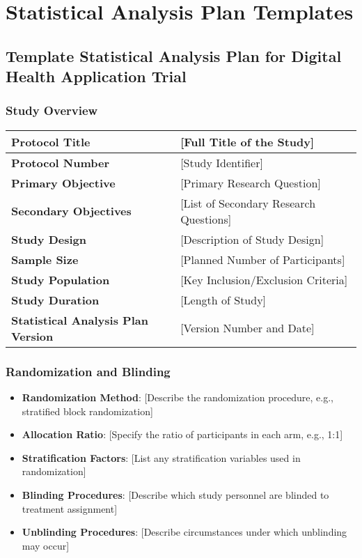 \chapter{Statistical Analysis Plan Templates}

\section{Template Statistical Analysis Plan for Digital Health Application Trial}

\subsection{Study Overview}

\begin{tcolorbox}[title=Study Information]
\begin{tabular}{|p{4cm}|p{10cm}|}
\hline
\textbf{Protocol Title} & [Full Title of the Study] \\
\hline
\textbf{Protocol Number} & [Study Identifier] \\
\hline
\textbf{Primary Objective} & [Primary Research Question] \\
\hline
\textbf{Secondary Objectives} & [List of Secondary Research Questions] \\
\hline
\textbf{Study Design} & [Description of Study Design] \\
\hline
\textbf{Sample Size} & [Planned Number of Participants] \\
\hline
\textbf{Study Population} & [Key Inclusion/Exclusion Criteria] \\
\hline
\textbf{Study Duration} & [Length of Study] \\
\hline
\textbf{Statistical Analysis Plan Version} & [Version Number and Date] \\
\hline
\end{tabular}
\end{tcolorbox}

\subsection{Randomization and Blinding}

\begin{itemize}
    \item \textbf{Randomization Method}: [Describe the randomization procedure, e.g., stratified block randomization]
    
    \item \textbf{Allocation Ratio}: [Specify the ratio of participants in each arm, e.g., 1:1]
    
    \item \textbf{Stratification Factors}: [List any stratification variables used in randomization]
    
    \item \textbf{Blinding Procedures}: [Describe which study personnel are blinded to treatment assignment]
    
    \item \textbf{Unblinding Procedures}: [Describe circumstances under which unblinding may occur]
\end{itemize}

